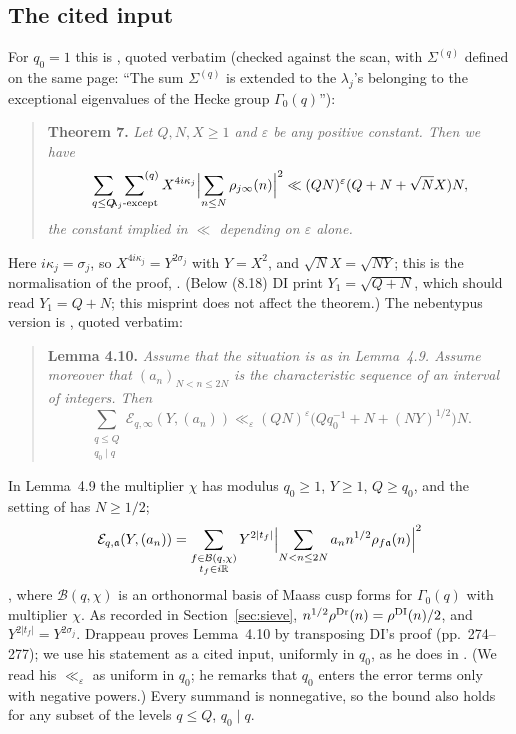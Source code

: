 \documentclass[10pt,reqno]{amsart}
\theoremstyle{definition}
\numberwithin{equation}{section}
\newcommand{\R}{\mathbb R}
\begin{document}
\subsection*{The cited input}
For $q_0=1$ this is \cite[Theorem~7, (1.41), p.~233]{DI}, quoted verbatim
(checked against the scan, with $\Sigma^{(q)}$ defined on the same page:
``The sum $\Sigma^{(q)}$ is extended to the $\lambda_j$'s belonging to the
exceptional eigenvalues of the Hecke group $\Gamma_0(q)$''):
\begin{quote}
\textbf{Theorem 7.} \emph{Let $Q,N,X\ge1$ and $\varepsilon$ be any positive
constant. Then we have}
\[
 \sum_{q\le Q}\ \sideset{}{^{(q)}}\sum_{\lambda_j\text{-except}}
 X^{4i\kappa_j}\Bigl|\sum_{n\le N}\rho_{j\infty}(n)\Bigr|^2
 \ll(QN)^\varepsilon(Q+N+\sqrt N X)N,
\]
\emph{the constant implied in $\ll$ depending on $\varepsilon$ alone.}
\end{quote}
Here $i\kappa_j=\sigma_j$, so $X^{4i\kappa_j}=Y^{2\sigma_j}$ with $Y=X^2$,
and $\sqrt NX=\sqrt{NY}$; this is the normalisation of the proof,
\cite[(8.17)--(8.19), pp.~276--278]{DI}. (Below (8.18) DI print
$Y_1=\sqrt{Q+N}$, which should read $Y_1=Q+N$; this misprint does not
affect the theorem.) The nebentypus version is
\cite[Lemma~4.10, arXiv p.~16]{Dr}, quoted verbatim:
\begin{quote}
\textbf{Lemma 4.10.} \emph{Assume that the situation is as in Lemma~4.9.
Assume moreover that $(a_n)_{N<n\le2N}$ is the characteristic sequence of
an interval of integers. Then}
\[
 \sum_{\substack{q\le Q\\ q_0\mid q}}\mathcal E_{q,\infty}(Y,(a_n))
 \ll_\varepsilon(QN)^\varepsilon\bigl(Qq_0^{-1}+N+(NY)^{1/2}\bigr)N.
\]
\end{quote}
In Lemma~4.9 the multiplier $\chi$ has modulus $q_0\ge1$, $Y\ge1$,
$Q\ge q_0$, and the setting of \cite[Proposition~4.7]{Dr} has $N\ge1/2$;
\[
 \mathcal E_{q,\mathfrak a}(Y,(a_n))=\sum_{\substack{f\in\mathcal B(q,\chi)\\
 t_f\in i\R}}Y^{2|t_f|}\Bigl|\sum_{N<n\le2N}a_nn^{1/2}\rho_{f\mathfrak a}(n)
 \Bigr|^2
\]
\cite[\S4.2.3]{Dr}, where $\mathcal B(q,\chi)$ is an orthonormal basis of
Maass cusp forms for $\Gamma_0(q)$ with multiplier $\chi$. As recorded in
Section~\ref{sec:sieve}, $n^{1/2}\rho^{\rm Dr}(n)=\rho^{\rm DI}(n)/2$, and
$Y^{2|t_f|}=Y^{2\sigma_j}$. Drappeau proves Lemma~4.10 by transposing
DI's proof (pp.~274--277); we use his statement as a cited input,
uniformly in $q_0$, as he does in \cite[\S4.3.1]{Dr}. (We read his
$\ll_\varepsilon$ as uniform in $q_0$; he remarks that $q_0$ enters the
error terms only with negative powers.) Every summand is nonnegative, so
the bound also holds for any subset of the levels $q\le Q$, $q_0\mid q$.
\end{document}
